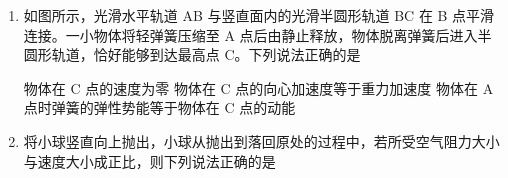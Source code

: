 \documentclass[\gkver]{gaokaozhenti}
\begin{document}
\begin{enumerate}
{B．灯泡正常发光，由 $P = UI$ 得，副线圈中电流有效值为 $I = \frac{P_{L}}{U_{2}} = \frac{3\UW}{6\UV} = 0.5\UA$。故 B 正确；

C．由理想变压器电压与匝数关系可知 $\frac{n_{1}}{n_{2}} = \frac{U_{1}}{U_{2}} = 4$。故 C 错误；

D．理想变压器没有能量损失，原线圈的输入功率等于副线圈的输出功率，则原线圈的输入功率 $P_{1} = P_{L} = 3\UW$。故 D 错误。

故选 B。

（2）A．闭合开关瞬间，由楞次定律可知，线圈 P 中感应电流的磁场与线圈 M 中电流的磁场方向相反，二者相互排斥，故 A 错误；

B．闭合开关，达到稳定后，通过线圈 P 的磁通量保持不变，感应电流为零，电流表的示数为零，故 B 正确；

CD．断开开关瞬间，通过线圈 P 的磁场方向向右，磁通量减小，由楞次定律可知感应电流的磁场方向向右，因此流过电流表的感应电流方向由 b 到 a，故 CD 错误。

故选 B。
}

\item
如图所示，光滑水平轨道 AB 与竖直面内的光滑半圆形轨道 BC 在 B 点平滑连接。一小物体将轻弹簧压缩至 A 点后由静止释放，物体脱离弹簧后进入半圆形轨道，恰好能够到达最高点 C。下列说法正确的是


{物体在 C 点的速度为零}
{物体在 C 点的向心加速度等于重力加速度}
{物体在 A 点时弹簧的弹性势能等于物体在 C 点的动能}


\item
将小球竖直向上抛出，小球从抛出到落回原处的过程中，若所受空气阻力大小与速度大小成正比，则下列说法正确的是


\end{enumerate}
\end{document}
